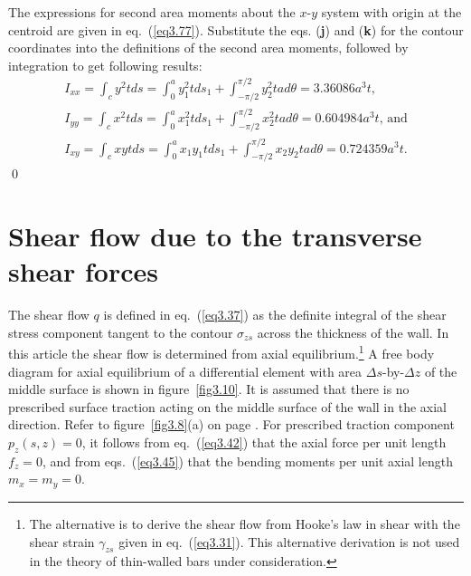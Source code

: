 \documentclass{AeroStructure-ERJohnson}
\begin{document}
\begin{example*}
\vspace*{-1pc}

The expressions for second area moments about the $x$-$y$ system with origin at the centroid are given in eq.~(\ref{eq3.77}). Substitute the eqs. (\textbf{j}) and (\textbf{k}) for the contour coordinates into the definitions of the second area moments, followed by integration to get following results:
\begin{gather}
I_{x x}=\int_{c} y^{2} t d s=\int_{0}^{a} y_{1}^{2} t d s_{1}+\int_{-\pi / 2}^{\pi / 2} y_{2}^{2} t a d \theta=3.36086 a^{3} t,\label{ex3.1l}\\[6pt]
I_{y y}=\int_{c} x^{2} t d s=\int_{0}^{a} x_{1}^{2} t d s_{1}+\int_{-\pi / 2}^{\pi / 2} x_{2}^{2} t a d \theta=0.604984 a^{3} t\mbox{, and}\label{ex3.1m}\\[6pt]
I_{x y}=\int_{c} x y t d s=\int_{0}^{a} x_{1} y_{1} t d s_{1}+\int_{-\pi / 2}^{\pi / 2} x_{2} y_{2} t a d \theta=0.724359 a^{3} t.\label{ex3.1n}
\end{gather}\hfill\qed
\end{example*}

\vspace*{-1.6pc}

\setcounter{equation}{84}
\section{Shear flow due to the transverse shear forces}\label{sec3.8}

The shear flow $q$ is defined in eq.~(\ref{eq3.37}) as the definite integral of the shear stress component tangent to the contour $\sigma_{z s}$ across the thickness of the wall. In this article the shear flow is determined from axial equilibrium.\footnote{The alternative is to derive the shear flow from Hooke's law in shear with the shear strain $\gamma_{zs}$ given in eq.~(\ref{eq3.31}). This alternative derivation is not used in the theory of thin-walled bars under consideration.} A free body diagram for axial equilibrium of a differential element with area $\Delta s$-by-$\Delta z$ of the middle surface is shown in figure~\ref{fig3.10}. It is assumed that there is no prescribed surface traction acting on the middle surface of the wall in the axial direction. Refer to figure~\ref{fig3.8}(a) on page \pageref{fig3.8}. For prescribed traction component $p_{z}(s, z)=0$, it follows from eq.~(\ref{eq3.42}) that the axial force per unit length $f_{z}=0$, and from eqs.~(\ref{eq3.45}) that the bending moments per unit axial length $m_{x}=m_{y}=0$.
\end{document}
